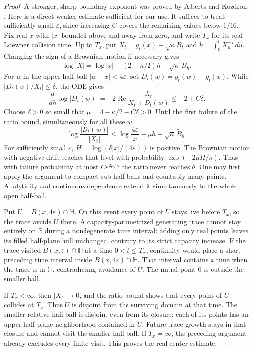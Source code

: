 \documentclass[11pt]{article}
\theoremstyle{definition}
\theoremstyle{remark}
\numberwithin{equation}{section}
\begin{document}
\begin{proof}
A stronger, sharp boundary exponent was proved by Alberts and
Kozdron \cite[Theorem~3.2 and Corollary~5.1]{albertskozdron2008}.
Here is a direct weaker estimate sufficient for our use.
It suffices to treat sufficiently small $\varepsilon$, since increasing
$C$ covers the remaining values below $1/16$.
Fix real $x$ with $|x|$ bounded above and away from zero, and write
$T_x$ for its real Loewner collision time. Up to $T_x$, put
$X_t=g_t(x)-\sqrt\kappa B_t$ and
$h=\int_0^tX_u^{-2}\,du$. Changing the sign of a Brownian motion
if necessary gives
\[
 \log|X|=\log|x|+(2-\kappa/2)h+\sqrt\kappa\,\widetilde B_h.
\]
For $w$ in the upper half-ball $|w-x|<4\varepsilon$, set
$D_t(w)=g_t(w)-g_t(x)$. While $|D_t(w)/X_t|\le\delta$, the ODE
gives
\[
 \frac{d}{dh}\log|D_t(w)|
      =-2\operatorname{Re}\frac{X_t}{X_t+D_t(w)}
      \le-2+C\delta.
\]
Choose $\delta>0$ so small that
$\mu=4-\kappa/2-C\delta>0$. Until the first failure of the ratio
bound, simultaneously for all these $w$,
\[
 \log\frac{|D_t(w)|}{|X_t|}
 \le\log\frac{4\varepsilon}{|x|}
             -\mu h-\sqrt\kappa\,\widetilde B_h.
\]
For sufficiently small $\varepsilon$,
$H=\log(\delta|x|/(4\varepsilon))$ is positive.  The Brownian motion
with negative drift reaches that level with probability
$\exp(-2\mu H/\kappa)$. Thus with failure
probability at most $C\varepsilon^{2\mu/\kappa}$ the ratio never
reaches $\delta$. One may first apply the argument to compact
sub-half-balls and countably many points. Analyticity and continuous
dependence extend it simultaneously to the whole open half-ball.

Put $U=B(x,4\varepsilon)\cap\mathbb H$.  On this event every point of
$U$ stays live before $T_x$, so the trace avoids $U$ there.  A
capacity-parametrized generating trace cannot stay entirely on
$\mathbb R$ during a nondegenerate time interval: adding only real
points leaves its filled half-plane hull unchanged, contrary to its
strict capacity increase.  If the trace visited
$B(x,\varepsilon)\cap\overline{\mathbb H}$ at a time $0<t\le T_x$,
continuity would place a short preceding time interval inside
$B(x,4\varepsilon)\cap\overline{\mathbb H}$.  That interval contains a
time when the trace is in $\mathbb H$, contradicting avoidance of $U$.
The initial point $0$ is outside the smaller ball.

If $T_x<\infty$, then $|X_t|\to0$, and the ratio bound shows that every
point of $U$ collides at $T_x$.  Thus $U$ is disjoint from the surviving
domain at that time.  The smaller relative half-ball is disjoint even
from its closure: each of its points has an upper-half-plane neighborhood
contained in $U$.  Future trace growth stays in that closure and cannot
visit the smaller half-ball.  If $T_x=\infty$, the preceding argument
already excludes every finite visit.  This proves the real-center estimate.


\end{proof}
\end{document}
